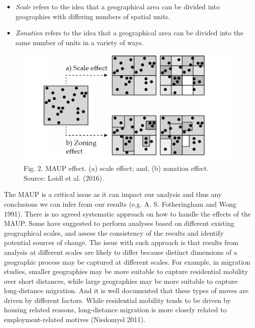 \documentclass[
  letterpaper,
  DIV=11,
  numbers=noendperiod,
  oneside]{scrreprt}
\begin{document}
\begin{itemize}
\item
  \emph{Scale} refers to the idea that a geographical area can be
  divided into geographies with differing numbers of spatial units.
\item
  \emph{Zonation} refers to the idea that a geographical area can be
  divided into the same number of units in a variety of ways.
\end{itemize}

\begin{figure}[H]

{\centering \includegraphics{figs/ch1/maup.png}

}

\caption{Fig. 2. MAUP effect. (a) scale effect; and, (b) zonation
effect. Source: Loidl et al. (2016).}

\end{figure}%

The MAUP is a critical issue as it can impact our analysis and thus any
conclusions we can infer from our results (e.g. A. S. Fotheringham and
Wong 1991). There is no agreed systematic approach on how to handle the
effects of the MAUP. Some have suggested to perform analyses based on
different existing geographical scales, and assess the consistency of
the results and identify potential sources of change. The issue with
such approach is that results from analysis at different scales are
likely to differ because distinct dimensions of a geographic process may
be captured at different scales. For example, in migration studies,
smaller geographies may be more suitable to capture residential mobility
over short distances, while large geographies may be more suitable to
capture long-distance migration. And it is well documented that these
types of moves are driven by different factors. While residential
mobility tends to be driven by housing related reasons, long-distance
migration is more closely related to employment-related motives
(Niedomysl 2011).
\end{document}
